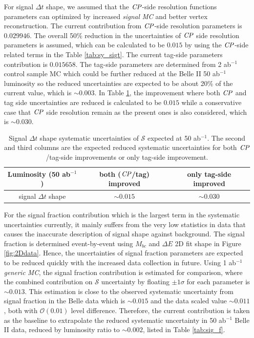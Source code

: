 For signal $\Delta t$ shape, we assumed that the $\it{CP}$-side resolution functions parameters can optimized by increased \textit{signal MC} and better vertex reconstruction. The current contribution from $\it{CP}$-side resolution parameters is $0.029946$. The overall 50\% reduction in the uncertainties of $\it{CP}$ side resolution parameters is assumed, which can be calculated to be $0.015$  by using the $\it{CP}$-side related terms in the Table \ref{tab:sy_sigt}. The current tag-side parameters contribution is $0.015658$. The tag-side parameters are determined from 2 ab$^{-1}$ control sample MC which could be further reduced at the Belle II  50 ab$^{-1}$ luminosity so the reduced uncertainties are expected to be about 20\% of the current value, which is $\sim0.003$. In Table  \ref{tab:sig_shape}, the improvement where both $\it{CP}$ and tag side uncertainties are reduced is calculated to be $0.015$ while a conservative case that $\it{CP}$ side resolution remain as the present ones is also considered, which is $\sim0.030$.
\begin{table}[H]
		\centering
		\caption{ Signal $\Delta t$ shape systematic uncertainties of $\mathcal{S}$ expected at 50 ab$^{-1}$. The second and third columns are the expected reduced systematic uncertainties for both $\it{CP}$/tag-side improvements or only tag-side improvement.}
		\label{tab:sig_shape}
		\begin{tabular}{c| c| c }
			\hline
			Luminosity (50 ab$^{-1}$) & both ($\it{CP}$/tag) improved & only tag-side improved \\
			\hline
			signal $\Delta t$ shape &  $\sim0.015$ & $\sim0.030$\\
			\hline
		\end{tabular}
\end{table}
For the signal fraction contribution which is the largest term in the systematic uncertainties currently, it mainly suffers from the very low statistics in data that causes the inaccurate description of signal shape against background. The signal fraction is determined event-by-event using $M_{bc}$ and $\Delta E$ 2D fit shape in Figure \ref{fig:2Ddata}. Hence, the uncertainties of signal fraction parameters are expected to be reduced quickly with the increased data collection in future. Using 1 ab$^{-1}$ \textit{generic MC}, the signal fraction contribution is estimated for comparison, where the combined contribution on $\mathcal{S}$ uncertainty by floating $\pm 1 \sigma$ for each parameter is $\sim 0.013$. This estimation is close to the observed systematic uncertainty from signal fraction in the Belle data which is  $\sim0.015$\cite{kang2020measurement} and the data scaled value  $\sim 0.011$, both with $\mathcal{O}(0.01)$ level difference. Therefore, the current contribution is taken as the baseline to extrapolate the reduced systematic uncertainty in 50 ab$^{-1}$ Belle II data, reduced by luminosity ratio to $\sim 0.002$, listed in Table \ref{tab:sig_f}.

